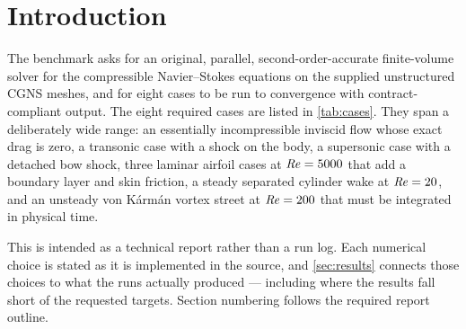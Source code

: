 \section{Introduction}
\label{sec:intro}

The benchmark asks for an original, parallel, second-order-accurate
finite-volume solver for the compressible Navier--Stokes equations on the
supplied unstructured CGNS meshes, and for eight cases to be run to
convergence with contract-compliant output. The eight required cases are
listed in \cref{tab:cases}. They span a deliberately wide range: an
essentially incompressible inviscid flow whose exact drag is zero, a transonic
case with a shock on the body, a supersonic case with a detached bow shock,
three laminar airfoil cases at $\mathit{Re}=5000$ that add a boundary layer and
skin friction, a steady separated cylinder wake at $\mathit{Re}=20$, and an
unsteady von K\'arm\'an vortex street at $\mathit{Re}=200$ that must be integrated
in physical time.

This is intended as a technical report rather than a run log. Each numerical
choice is stated as it is implemented in the source, and \cref{sec:results}
connects those choices to what the runs actually produced --- including where
the results fall short of the requested targets. Section numbering follows the
required report outline.

